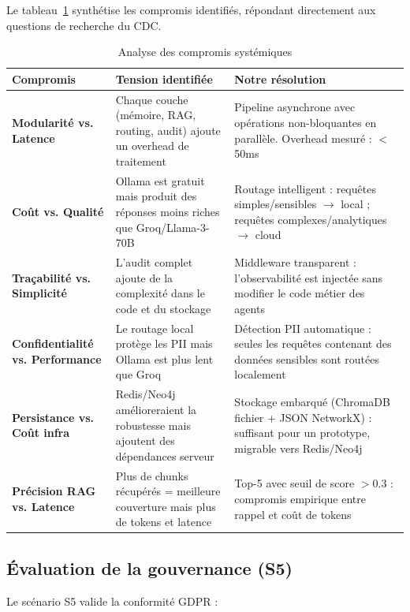 \documentclass[12pt, a4paper]{article}
\begin{document}
Le tableau~\ref{tab:tradeoffs} synthétise les compromis identifiés, répondant directement aux questions de recherche du CDC.

\begin{table}[H]
\centering
\caption{Analyse des compromis systémiques}
\label{tab:tradeoffs}
\small
\begin{tabularx}{\textwidth}{l X X}
\toprule
\textbf{Compromis} & \textbf{Tension identifiée} & \textbf{Notre résolution} \\
\midrule
\textbf{Modularité vs. Latence} & Chaque couche (mémoire, RAG, routing, audit) ajoute un overhead de traitement & Pipeline asynchrone avec opérations non-bloquantes en parallèle. Overhead mesuré : $<$50ms \\
\addlinespace
\textbf{Coût vs. Qualité} & Ollama est gratuit mais produit des réponses moins riches que Groq/Llama-3-70B & Routage intelligent : requêtes simples/sensibles $\rightarrow$ local ; requêtes complexes/analytiques $\rightarrow$ cloud \\
\addlinespace
\textbf{Traçabilité vs. Simplicité} & L'audit complet ajoute de la complexité dans le code et du stockage & Middleware transparent : l'observabilité est injectée sans modifier le code métier des agents \\
\addlinespace
\textbf{Confidentialité vs. Performance} & Le routage local protège les PII mais Ollama est plus lent que Groq & Détection PII automatique : seules les requêtes contenant des données sensibles sont routées localement \\
\addlinespace
\textbf{Persistance vs. Coût infra} & Redis/Neo4j amélioreraient la robustesse mais ajoutent des dépendances serveur & Stockage embarqué (ChromaDB fichier + JSON NetworkX) : suffisant pour un prototype, migrable vers Redis/Neo4j \\
\addlinespace
\textbf{Précision RAG vs. Latence} & Plus de chunks récupérés = meilleure couverture mais plus de tokens et latence & Top-5 avec seuil de score $>0.3$ : compromis empirique entre rappel et coût de tokens \\
\bottomrule
\end{tabularx}
\end{table}

\subsection{Évaluation de la gouvernance (S5)}

Le scénario S5 valide la conformité GDPR :
\end{document}
